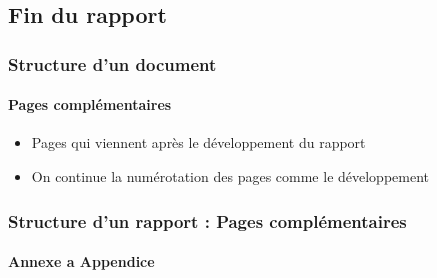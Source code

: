 \documentclass[xcolor=table]{beamer}
\begin{document}
\subsection{Fin du rapport}

\begin{frame}
\frametitle{Structure d'un document}
\framesubtitle{Pages complémentaires}

\begin{itemize}
	\item Pages qui viennent après le développement du rapport
	\item On continue la numérotation des pages comme le développement
\end{itemize}

\end{frame}

\begin{frame}
\frametitle{Structure d'un rapport : Pages complémentaires}
\framesubtitle{Annexe a Appendice}

\begin{minipage}{0.60\textwidth}
	

\end{minipage}
\end{frame}
\end{document}
